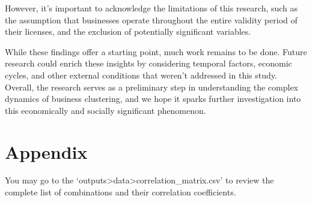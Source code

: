 \documentclass[
]{article}
\begin{document}
However, it's important to acknowledge the limitations of this research, such as the assumption that businesses operate throughout the entire validity period of their licenses, and the exclusion of potentially significant variables.

While these findings offer a starting point, much work remains to be done. Future research could enrich these insights by considering temporal factors, economic cycles, and other external conditions that weren't addressed in this study. Overall, the research serves as a preliminary step in understanding the complex dynamics of business clustering, and we hope it sparks further investigation into this economically and socially significant phenomenon.

\newpage

\appendix

\hypertarget{appendix}{%
\section*{Appendix}\label{appendix}}

You may go to the `outputs\textgreater data\textgreater correlation\_matrix.csv' to review the complete list of combinations and their correlation coefficients.

\newpage

\renewcommand\refname{References}
  
\end{document}
